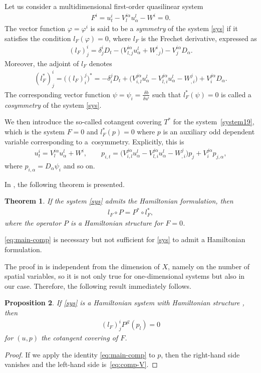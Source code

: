 \documentclass[10pt,a4paper]{amsart}
\numberwithin{equation}{section}
\newtheorem{Theorem}{Theorem}[section]
\newtheorem{Proposition}[Theorem]{Proposition}
 { \theoremstyle{definition}
\newtheorem{Definition}[Theorem]{Definition}
\newtheorem{Note}[Theorem]{Note}
\newtheorem{Example}[Theorem]{Example}
\newtheorem{Remark}[Theorem]{Remark} }
\begin{document}
Let us consider a multidimensional first-order quasilinear system
\begin{gather}\label{system19}
F^i=u^i_t-V^{i\alpha}_lu^l_\alpha-W^i=0.
\end{gather}
The vector function $\varphi=\varphi^i$ is said to be a \emph{symmetry} of the system \eqref{sys} if it satisfies the condition $l_F(\varphi)=0$, where $l_F$ is the Frechet derivative, expressed as
\begin{gather*}
(l_F)^i_j=\delta^i_jD_t-\big(V^{i\alpha}_{l,j}u^l_\alpha+W^i_{,j}\big)-V^{i\alpha}_jD_\alpha.
\end{gather*}
Moreover, the adjoint of $l_F$ denotes
\begin{gather*}
(l^*_F)^i_j=\big((l_F)^j_i\big)^*=-\delta^j_iD_t+\big(V^{j\alpha}_{i,l}u^l_\alpha-V^{j\alpha}_{l,i}u^l_\alpha-W^j_{,i}\big)+V^{j\alpha}_iD_\alpha.
\end{gather*}
The corresponding vector function $\psi=\psi_i=\frac{\delta b}{\delta u^i}$ such that $l^*_F(\psi)=0$ is called a \emph{cosymmetry} of the system \eqref{sys}.

We then introduce the so-called cotangent covering $T^*$ for the system~\eqref{system19}, which is the system $F=0$ and $l^*_F(p)=0$ where $p$ is an auxiliary odd dependent variable corresponding to a~cosymmetry. Explicitly, this is
\begin{gather}\label{cov}
u^i_t=V^{i\alpha}_lu^l_\alpha+W^i,\qquad
p_{i,t}=\big(V^{j\alpha}_{i,l}u^l_\alpha-V^{j\alpha}_{l,i}u^l_\alpha-W^j_{,i}\big)p_j+V^{j\alpha}_ip_{j,\alpha},
\end{gather}
where $p_{i,\alpha}=D_\alpha\psi_i$ and so on.

In \cite{kersten2004hamiltonian}, the following theorem is presented.
\begin{Theorem}
If the system \eqref{sys} admits the Hamiltonian formulation, then
\begin{gather}\label{eq:main-comp}
l_F\circ P=P^*\circ l_F^*,
\end{gather}
where the operator $P$ is a Hamiltonian structure for $F=0$.
\end{Theorem}
\begin{Remark}
\eqref{eq:main-comp} is necessary but not sufficient for \eqref{sys} to admit a Hamiltonian formulation.
\end{Remark}
The proof in \cite{kersten2004hamiltonian} is independent from the dimension of $X$, namely on the number of spatial variables, so it is not only true for one-dimensional systems but also in our case. Therefore, the following result immediately follows.
\begin{Proposition}
If \eqref{sys} is a Hamiltonian system with Hamiltonian structure , then
\begin{gather}\label{eq:comp-V}
(l_F)^i_jP^{jl}(p_l)=0
\end{gather}
for $(u,p)$ the cotangent covering of $F$.
\end{Proposition}
\begin{proof}
If we apply the identity \eqref{eq:main-comp} to $p$, then the right-hand side vanishes and the left-hand side is~\eqref{eq:comp-V}.
\end{proof}
\end{document}
